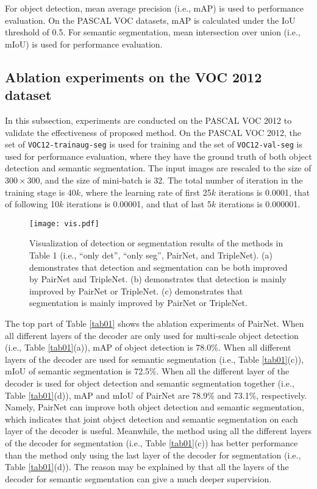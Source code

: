 \documentclass[10pt,twocolumn,letterpaper]{article}
\begin{document}
For object detection, mean average precision (i.e., mAP) is used to performance evaluation. On the PASCAL VOC datasets, mAP is calculated under the IoU threshold of 0.5. For semantic segmentation, mean intersection over union (i.e., mIoU) is used for performance evaluation.

\subsection{Ablation experiments on the VOC 2012 dataset}
In this subsection, experiments are conducted on the PASCAL VOC 2012 to validate the effectiveness of proposed method.
On the PASCAL VOC 2012, the set of \texttt{VOC12-trainaug-seg} is used for training and the set of \texttt{VOC12-val-seg} is used for performance evaluation, where they have the ground truth of both object detection and semantic segmentation. The input images are rescaled to the size of $300\times 300$, and the size of mini-batch is 32. The total number of iteration in the training stage is 40$k$, where the learning rate of first 25$k$ iterations is 0.0001, that of following 10$k$ iterations is 0.00001, and that of last 5$k$ iterations is 0.000001.  
\begin{figure*}[t]
\begin{center}
\texttt{[image: vis.pdf]}
\end{center}
   \caption{Visualization of detection or segmentation results of the methods in Table 1 (i.e., ``only det'', ``only seg'', PairNet, and TripleNet). (a) demonstrates that detection and segmentation can be both improved by PairNet and TripleNet. (b) demonstrates that detection is mainly improved by PairNet or TripleNet. (c) demonstrates that segmentation is mainly improved by PairNet or TripleNet.}
\label{fig04}
\end{figure*}

The top part of Table \ref{tab01} shows the ablation experiments of PairNet. When all different layers of the decoder are only used for multi-scale object detection (i.e., Table \ref{tab01}(a)), mAP of object detection is 78.0\%. When all different layers of the decoder are used for semantic segmentation (i.e., Table \ref{tab01}(c)), mIoU of semantic segmentation is 72.5\%. When all the different layer of the decoder is used for object detection and semantic segmentation together (i.e., Table \ref{tab01}(d)), mAP and mIoU of PairNet are 78.9\% and 73.1\%, respectively. Namely, PairNet can improve both object detection and semantic segmentation, which indicates that joint object detection and semantic segmentation on each layer of the decoder is useful. Meanwhile, the method using all the different layers of the decoder for segmentation (i.e., Table \ref{tab01}(c)) has better performance than the method only using the last layer of the decoder for segmentation (i.e., Table \ref{tab01}(d)). The reason may be explained by that all the layers of the decoder for semantic segmentation can give a much deeper supervision.
\end{document}
